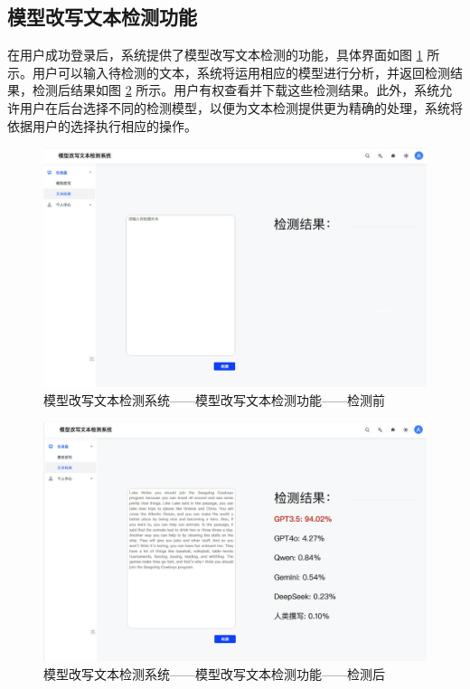 \subsection{模型改写文本检测功能}

在用户成功登录后，系统提供了模型改写文本检测的功能，具体界面如图 \ref{fig:sys-detect} 所示。用户可以输入待检测的文本，系统将运用相应的模型进行分析，并返回检测结果，检测后结果如图 \ref{fig:sys-detect2} 所示。用户有权查看并下载这些检测结果。此外，系统允许用户在后台选择不同的检测模型，以便为文本检测提供更为精确的处理，系统将依据用户的选择执行相应的操作。

\begin{figure}[htb]
    \centering
    \includegraphics[width=\textwidth]{figures/sys-detect.jpg}
    \caption{模型改写文本检测系统——模型改写文本检测功能——检测前}
    \label{fig:sys-detect}
\end{figure}

\begin{figure}[htb]
    \centering
    \includegraphics[width=\textwidth]{figures/sys-detect2.jpg}
    \caption{模型改写文本检测系统——模型改写文本检测功能——检测后}
    \label{fig:sys-detect2}
\end{figure}

